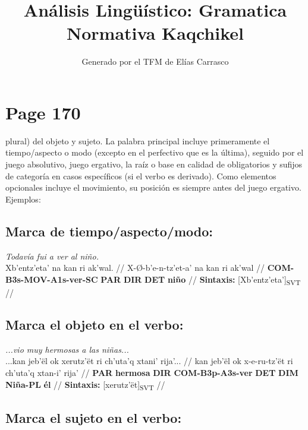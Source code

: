 \documentclass{article}%
\title{Análisis Lingüístico: Gramatica Normativa Kaqchikel}%
\author{Generado por el TFM de Elías Carrasco}%
\begin{document}
%
\normalsize%
\maketitle%
\section{Page 170}%
\label{sec:Page170}%
plural) del objeto y sujeto. La palabra principal incluye primeramente el tiempo/aspecto %
o modo (excepto en el perfectivo que es la última), seguido por el juego absolutivo, %
juego ergativo, la raíz o base en calidad de obligatorios y sufijos de categoría en casos %
específicos (si el verbo es derivado). Como elementos opcionales incluye el movimiento, %
su posición es siempre antes del juego ergativo. Ejemplos: %
\subsection{Marca de tiempo/aspecto/modo:}%
\label{subsec:Marcadetiempo/aspecto/modo}%

%
\par\medskip%
\ex
\textit{Todavía fui a ver al niño.} \\
\begingl
\gla Xb'entz'eta' na kan ri ak'wal. //
\glb X-Ø-b'e-n-tz'et-a' na kan ri ak'wal //
\glc \textbf{COM-}\textbf{B3s-}\textbf{MOV-}\textbf{A1s-}\textbf{ver-}\textbf{SC} \textbf{PAR} \textbf{DIR} \textbf{DET} \textbf{niño} //
\glft \textbf{Sintaxis:} [Xb'entz'eta']\textsubscript{SVT} //
\endgl
\xe
%
\medskip%
\subsection{Marca el objeto en el verbo:}%
\label{subsec:Marcaelobjetoenelverbo}%

%
\par\medskip%
\ex
\textit{...vio muy hermosas a las niñas...} \\
\begingl
\gla ...kan jeb'ël ok xerutz'ët ri ch'uta'q xtani' rija'... //
\glb kan jeb'ël ok x-e-ru-tz'ët ri ch'uta'q xtan-i' rija' //
\glc \textbf{PAR} \textbf{hermosa} \textbf{DIR} \textbf{COM-}\textbf{B3p-}\textbf{A3s-}\textbf{ver} \textbf{DET} \textbf{DIM} \textbf{Niña-}\textbf{PL} \textbf{él} //
\glft \textbf{Sintaxis:} [xerutz'ët]\textsubscript{SVT} //
\endgl
\xe
%
\medskip%
\subsection{Marca el sujeto en el verbo:}%
\label{subsec:Marcaelsujetoenelverbo}%
\end{document}
